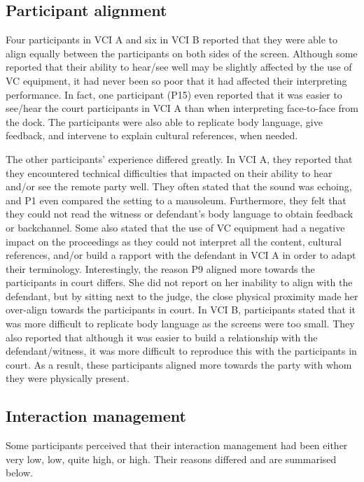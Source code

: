 \documentclass[output=paper]{langsci/langscibook}
\begin{document}
\subsection{Participant alignment}

Four participants in VCI A and six in VCI B reported that they were able to align equally between the participants on both sides of the screen. Although some reported that their ability to hear/see well may be slightly affected by the use of VC equipment, it had never been so poor that it had affected their interpreting performance. In fact, one participant (P15) even reported that it was easier to see/hear the court participants in VCI A than when interpreting face-to-face from the dock. The participants were also able to replicate body language, give feedback, and intervene to explain cultural references, when needed. 

The other participants’ experience differed greatly. In VCI A, they reported that they encountered technical difficulties that impacted on their ability to hear and/or see the remote party well. They often stated that the sound was echoing, and P1 even compared the setting to a mausoleum. Furthermore, they felt that they could not read the witness or defendant’s body language to obtain feedback or backchannel. Some also stated that the use of VC equipment had a negative impact on the proceedings as they could not interpret all the content, cultural references, and/or build a rapport with the defendant in VCI A in order to adapt their terminology. Interestingly, the reason P9 aligned more towards the participants in court differs. She did not report on her inability to align with the defendant, but by sitting next to the judge, the close physical proximity made her over-align towards the participants in court. In VCI B, participants stated that it was more difficult to replicate body language as the screens were too small. They also reported that although it was easier to build a relationship with the defendant/witness, it was more difficult to reproduce this with the participants in court. As a result, these participants aligned more towards the party with whom they were physically present. 

\subsection{Interaction management} 

Some participants perceived that their interaction management had been either very low, low, quite high, or high. Their reasons differed and are summarised below. 
\end{document}
